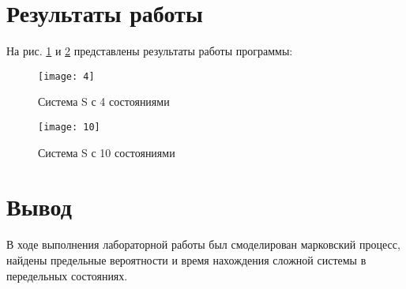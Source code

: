 \documentclass[a4paper, 14pt]{article}
\begin{document}
\section*{Результаты работы}

На рис. \ref{fig:4} и  \ref{fig:10} представлены результаты работы программы:

\begin{figure}[H]
    \texttt{[image: 4]}
    \caption{Система S с 4 состояниями}
    \label{fig:4}
\end{figure}

\begin{figure}[H]
    \texttt{[image: 10]}
    \caption{Система S с 10 состояниями}
    \label{fig:10}
\end{figure}

\section*{Вывод}
В ходе выполнения лабораторной работы был смоделирован марковский процесс, найдены предельные вероятности и время нахождения сложной системы в передельных состояниях.
\end{document}
